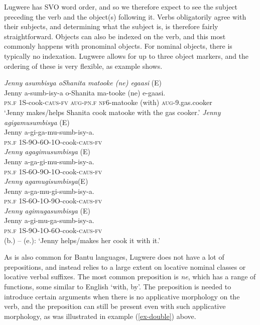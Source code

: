 \documentclass[output=paper,colorlinks,citecolor=brown,draftmode]{langscibook}
\begin{document}
Lugwere has SVO word order, and so we therefore expect to see the subject preceding the verb and the object(s) following it. Verbs obligatorily agree with their subjects, and determining what the subject is, is therefore fairly straightforward. Objects can also be indexed on the verb, and this most commonly happens with pronominal objects. For nominal objects, there is typically no indexation.  Lugwere allows for up to three object markers, and the ordering of these is very flexible, as example  shows.

\newpage
\ea
\begin{xlist}   \label{ex:Saebo:object-markers}
 \ex \emph{Jenny asumbisya oShanita matooke (ne) egaasi} (E)\\
  \gll Jenny a-sumb-isy-a o-Shanita ma-tooke (ne) e-gaasi.  \\ 
\textsc{pn.f}  1S-cook-\textsc{caus-fv} \textsc{aug-pn.f}  \textsc{nf6-}matooke (with) \textsc{aug}-9.gas.cooker \\
    \glt  `Jenny makes/helps Shanita cook matooke with the gas cooker.'
     \ex \emph{Jenny agigamusumbisya} (E)\\
  \gll  Jenny a-gi-ga-mu-sumb-isy-a.\\ 
\textsc{pn.f} 1S-9O-6O-1O-cook-\textsc{caus-fv} \\
\ex \emph{Jenny agagimusumbisya} (E)\\
  \gll  Jenny a-ga-gi-mu-sumb-isy-a.\\ 
\textsc{pn.f} 1S-6O-9O-1O-cook-\textsc{caus-fv}\\
 \ex \emph{Jenny agamugisumbisya}(E) \\
  \gll  Jenny a-ga-mu-gi-sumb-isy-a.\\ 
\textsc{pn.f} 1S-6O-1O-9O-cook-\textsc{caus-fv}\\
\ex \emph{Jenny agimugasumbisya} (E) \\
  \gll  Jenny a-gi-mu-ga-sumb-isy-a.\\ 
\textsc{pn.f} 1S-9O-1O-6O-cook-\textsc{caus-fv}\\
    \glt  (b.) -- (e.): `Jenny helps/makes her cook it with it.' 
      \end{xlist}     
      \z
      
As is also common for Bantu languages, Lugwere does not have a lot of prepositions, and instead relies to a large extent on locative nominal classes or locative verbal suffixes. The most common preposition is \emph{ne}, which has a range of functions, some similar to English `with, by'. The preposition is needed to introduce certain arguments when there is no applicative morphology on the verb, and the preposition can still be present even with such applicative morphology, as was illustrated in example (\ref{ex-double}) above. 
\end{document}
